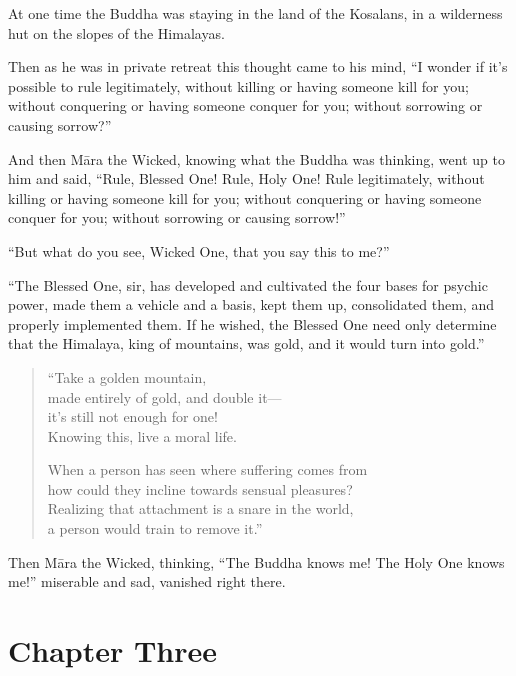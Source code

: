 \documentclass[12pt,openany]{book}%
\let\oldcontentsline\contentsline
\newcommand{\nopagecontentsline}[3]{\oldcontentsline{#1}{#2}{}}
\newcommand*{\tocchapterline}[1]{\bfseries\itshape{#1}}
\begin{document}
At one time the Buddha was staying in the land of the Kosalans, in a wilderness hut on the slopes of the Himalayas. 

Then as he was in private retreat this thought came to his mind, “I wonder if it’s possible to rule legitimately, without killing or having someone kill for you; without conquering or having someone conquer for you; without sorrowing or causing sorrow?” 

And then \textsanskrit{Māra} the Wicked, knowing what the Buddha was thinking, went up to him and said, “Rule, Blessed One! Rule, Holy One! Rule legitimately, without killing or having someone kill for you; without conquering or having someone conquer for you; without sorrowing or causing sorrow!” 

“But what do you see, Wicked One, that you say this to me?” 

“The Blessed One, sir, has developed and cultivated the four bases for psychic power, made them a vehicle and a basis, kept them up, consolidated them, and properly implemented them. If he wished, the Blessed One need only determine that the Himalaya, king of mountains, was gold, and it would turn into gold.” 

\begin{verse}%
“Take a golden mountain, \\
made entirely of gold, and double it—\\
it’s still not enough for one! \\
Knowing this, live a moral life. 

When a person has seen where suffering comes from \\
how could they incline towards sensual pleasures? \\
Realizing that attachment is a snare in the world, \\
a person would train to remove it.” 

%
\end{verse}

Then \textsanskrit{Māra} the Wicked, thinking, “The Buddha knows me! The Holy One knows me!” miserable and sad, vanished right there. 

%
\chapter*{Chapter Three}
\addcontentsline{toc}{chapter}{\tocchapterline{Chapter Three}}
\addtocontents{toc}{\let\protect\contentsline\protect\oldcontentsline}
\end{document}
